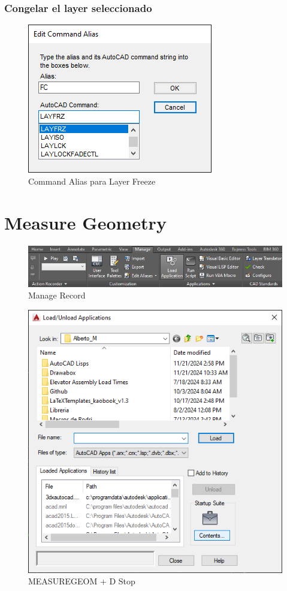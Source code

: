 \documentclass{report}
\begin{document}
\subsection{Congelar el layer seleccionado}

\begin{figure}[H]
	\centering
	\includegraphics[width=0.75\linewidth, height=0.45\textheight,keepaspectratio]{Imagenes/autocad_alias_layeroptions_04}
	\caption{Command Alias para Layer Freeze}
	\label{fig:autocadaliaslayeroptions04}
\end{figure}


\chapter{Measure Geometry}

\begin{figure}[H]
	\centering
	\includegraphics[width=0.55\linewidth, height=0.35\textheight,keepaspectratio]{Imagenes/autocad_measuregeom01}
	\caption{Manage \textrightarrow Record}
	\label{fig:autocadmeasuregeom01}
\end{figure}

\begin{figure}[H]
	\centering
	\includegraphics[width=0.65\linewidth, height=0.35\textheight,keepaspectratio]{Imagenes/autocad_measuregeom02}
	\caption{MEASUREGEOM + D \textrightarrow Stop}
	\label{fig:autocadmeasuregeom02}
\end{figure}
\end{document}
